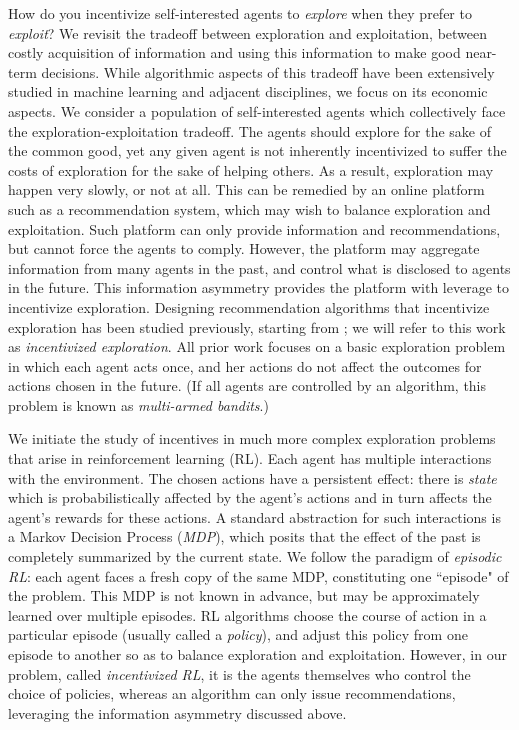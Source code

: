 How do you incentivize self-interested agents to \emph{explore} when they prefer to \emph{exploit}? We revisit the tradeoff between exploration and exploitation, \ie between costly acquisition of information and using this information to make good near-term decisions. While algorithmic aspects of this tradeoff have been extensively studied in machine learning and adjacent disciplines, we focus on its economic aspects. We consider a population of self-interested agents which collectively face the exploration-exploitation tradeoff. The agents should explore for the sake of the common good, yet any given agent is not inherently incentivized to suffer the costs of exploration for the sake of helping others. As a result, exploration may happen very slowly, or not at all. This can be remedied by an online platform such as a recommendation system, which may wish to balance exploration and exploitation. Such platform can only provide information and recommendations, but cannot force the agents to comply. However, the platform may aggregate information from many agents in the past, and control what is disclosed to agents in the future. This information asymmetry provides the platform with leverage to incentivize exploration. Designing recommendation algorithms that incentivize exploration has been studied previously, starting from \citep{Kremer-JPE14,Che-13}; we will refer to this work as \emph{incentivized exploration}. All prior work focuses on a basic exploration problem in which each agent acts once, and her actions do not affect the outcomes for actions chosen in the future.%
(If all agents are controlled by an algorithm, this problem is known as \emph{multi-armed bandits}.)

We initiate the study of incentives in much more complex exploration problems that arise in reinforcement learning (RL). Each agent has multiple interactions with the environment. The chosen actions have a persistent effect: there is \emph{state} which is probabilistically affected by the agent's actions and in turn affects the agent's rewards for these actions. A standard abstraction for such interactions is a Markov Decision Process (\emph{MDP}), which posits that the effect of the past is completely summarized by the current state. We follow the paradigm of \emph{episodic RL}: each agent faces a fresh copy of the same MDP, constituting one ``episode" of the problem. This MDP is not known in advance, but may be approximately learned over multiple episodes. RL algorithms choose the course of action in a particular episode (usually called a \emph{policy}), and adjust this policy from one episode to another so as to balance exploration and exploitation. However, in our problem, called \emph{incentivized RL}, it is the agents themselves who control the choice of policies, whereas an algorithm can only issue recommendations, leveraging the information asymmetry discussed above.

